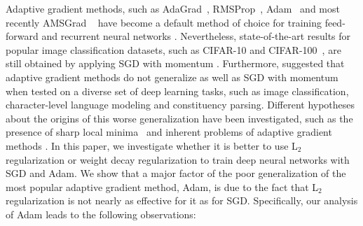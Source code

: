 \documentclass[usenames,dvipsnames]{article} %
\begin{document}
Adaptive gradient methods, such as AdaGrad~\citep{duchi2011adaptive}, RMSProp~\citep{tieleman2012lecture}, Adam~\citep{kingma2014adam} and most recently AMSGrad ~\citep{reddi2018iclr} have become a default method of choice for training feed-forward and recurrent neural networks \citep{xu2015show,  radford2015unsupervised}. Nevertheless, state-of-the-art results for popular image classification datasets, such as CIFAR-10 and CIFAR-100~\cite{krizhevsky2009learning}, are still obtained by applying SGD with momentum \citep{gastaldi2017shake, cubuk2018autoaugment}. Furthermore, \cite{wilson2017marginal} suggested that adaptive gradient methods do not generalize as well as SGD with momentum when tested on a diverse set of deep learning tasks, such as image classification, character-level language modeling and constituency parsing.
Different hypotheses about the origins of this worse generalization have been investigated, such as the presence of sharp local minima~\citep{keskar2016large,dinh2017sharp} and inherent problems of adaptive gradient methods \citep{wilson2017marginal}. In this paper, we investigate whether it is better to use L$_2$ regularization or weight decay regularization to train deep neural networks with SGD and Adam. We show that a major factor of the poor generalization of the most popular adaptive gradient method, Adam, is due to the fact that L$_2$ regularization is not nearly as effective for it as for SGD. %
Specifically, our analysis of Adam %
leads to the following observations: 

\end{document}
